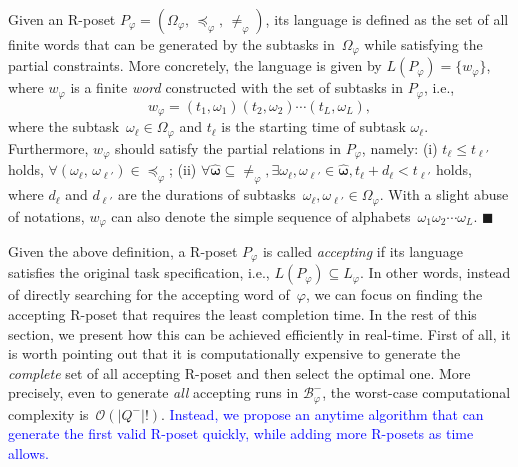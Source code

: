 \begin{definition}\label{def:language-poset}
Given an R-poset $P_\varphi=(\Omega_{\varphi}, \, \preceq_{\varphi}, \, \neq_{\varphi})$,
its language is defined as the set of all finite words
that can be generated by the subtasks in~$\Omega_{\varphi}$
while satisfying the partial constraints.
More concretely, the language is given by
$L(P_\varphi)=\{w_{\varphi}\}$, where $w_{\varphi}$ is a finite
\emph{word} constructed with the set of subtasks in $P_\varphi$, i.e.,
\begin{equation}\label{eq:poset-language}
w_{\varphi}=(t_1,\omega_1) (t_2,\omega_2)\cdots (t_L,\omega_L),
\end{equation}
where the subtask~$\omega_\ell \in \Omega_\varphi$ and
$t_\ell$ is the starting time of subtask $\omega_\ell$.
Furthermore, $w_{\varphi}$ should satisfy the partial relations in $P_\varphi$, namely:
(i) $t_\ell \leq t_{\ell'}$ holds,
$\forall (\omega_\ell,\,\omega_{\ell'})\in \preceq_{\varphi}$;
(ii) $\forall \boldsymbol{\hat{\omega}}\subseteq \neq_{\varphi}, 
\exists\omega_{\ell},\omega_{\ell'}\in\boldsymbol{\hat{\omega}}, t_\ell + d_\ell <  t_{\ell'}$ holds,
where $d_\ell$ and $d_{\ell'}$ are the durations of
subtasks~$\omega_\ell, \omega_{\ell'} \in \Omega_{\varphi}$.
With a slight abuse of notations, $w_\varphi$ can also denote the
simple sequence of alphabets~$\omega_1\omega_2\cdots \omega_L$.
\hfill $\blacksquare$
\end{definition}

Given the above definition, a R-poset $P_\varphi$ is called \emph{accepting}
if its language satisfies the original task specification, i.e.,
$L(P_\varphi)\subseteq L_\varphi$.
In other words, instead of directly searching for the accepting word of~$\varphi$,
we can focus on finding the accepting R-poset that
requires the least completion time.
In the rest of this section, we present how this can be achieved efficiently
in real-time.
First of all, it is worth pointing out that it is computationally expensive to
generate the \emph{complete} set of all accepting R-poset
and then select the optimal one.
More precisely, even to generate \emph{all} accepting runs in $\mathcal{B}_{\varphi}^-$,
the worst-case computational complexity is~$\mathcal{O}(|Q^-|!)$.
\textcolor{blue}{Instead, we propose an anytime algorithm that can generate the first valid
R-poset quickly, while adding more R-posets as time allows.}

